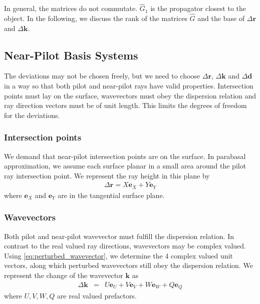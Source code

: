 \documentclass[12pt,a4paper,twoside,openright,BCOR10mm,headsepline,titlepage,abstracton,chapterprefix,final]{scrreprt}
\newcommand\Vector[1]{{\mathbf{#1}}}
\newcommand\wavenumber{k}
\newcommand\Wavevector{\Vector{\wavenumber}}
\begin{document}
In general, the matrices do not commutate. $\hat{G}_1$ is the propagator closest to the object.
In the following, we discuss the rank of the matrices $\hat{G}$ and the base of $\Delta \Vector{r}$ and $\Delta \Wavevector$.


\subsection{Near-Pilot Basis Systems}

The deviations may not be chosen freely, but we need to choose
$\Delta\Vector{r}$, $\Delta\Wavevector$ and $\Delta\Vector{d}$ 
in a way so that both pilot and near-pilot rays
have valid properties.
Intersection points must lay on the surface,
wavevectors must obey the dispersion relation 
and ray direction vectors must be of unit length.
This limits the degrees of freedom for the deviations.

\subsubsection{Intersection points}

We demand that near-pilot intersection points are on the surface.
In parabasal approximation, we assume each surface planar in a small area around the pilot ray intersection point. 
We represent the ray height in this plane by
\begin{eqnarray}
 \Delta\Vector{r} = X \Vector{e}_{X} + Y \Vector{e}_{Y}
 \label{eq:deltaR_equals_XY}
\end{eqnarray}
where $\Vector{e}_{X}$ and $\Vector{e}_{Y}$ are in the tangential surface plane.

\subsubsection{Wavevectors}
Both pilot and near-pilot wavevector must fulfill the dispersion relation. 
In contrast to the real valued ray directions, wavevectors may be complex valued.
Using \eqref{eq:perturbed_wavevector}, we determine the 4 complex valued unit vectors,
along which perturbed wavevectors still obey the dispersion relation.
We represent the change of the wavevector $\Wavevector$ as
\begin{eqnarray}
 \Delta \Wavevector &=& U \Vector{e}_U + V \Vector{e}_V + W \Vector{e}_W + Q \Vector{e}_Q
\end{eqnarray}
where $U,V,W,Q$ are real valued prefactors.
\end{document}
